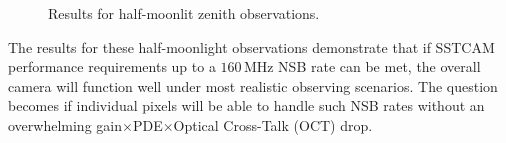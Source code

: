 \begin{figure}[ht]
\begin{minipage}{\linewidth}\centering
{}

\caption{Results for half-moonlit zenith observations.}
\label{fig:hm}

\end{minipage}
\end{figure}
The results for these half-moonlight observations demonstrate that if SSTCAM performance requirements up to a $\mathrm{160\,MHz}$ NSB rate can be met, the overall camera will function well under most realistic observing scenarios. The question becomes if individual pixels will be able to handle such NSB rates without an overwhelming gain$\times$PDE$\times$Optical Cross-Talk (OCT) drop.


